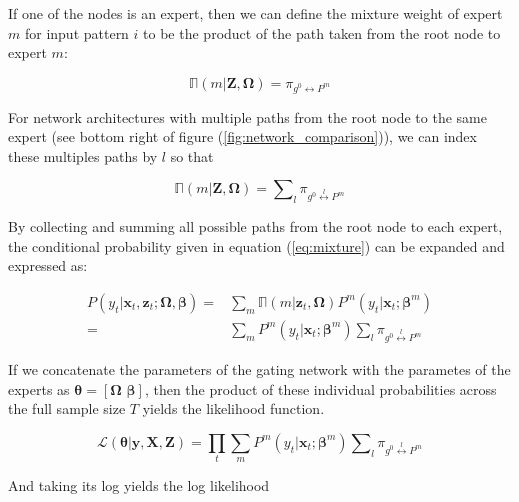 \documentclass[12pt]{article}
\newcommand{\gateprod}[2]{\pi_{#1 \longleftrightarrow #2}}
\newcommand{\sumgateprod}[3]{\pi_{#1 \overset{#3}{\longleftrightarrow} #2}}
\newcommand{\shortsum}[1]{\sum \nolimits_{#1}}
\newcommand{\expmixwt}[0]{\mathbb{\Pi}}
\begin{document}
If one of the nodes is an expert, then we can define the mixture weight
of expert $m$ for input pattern $i$ to be the product of the path taken
from the root node to expert $m$:

\begin{equation} \label{eq:gpath2}
  \expmixwt(m | \boldsymbol{Z}, \boldsymbol{\Omega}) = \gateprod{g^{0}}{P^{m}}
\end{equation}

For network architectures with multiple paths from the root node to
the same expert (see bottom right of figure (\ref{fig:network_comparison})),
we can index these multiples paths by $l$ so that

\begin{equation} \label{eq:pathsums}
  \expmixwt(m | \boldsymbol{Z}, \boldsymbol{\Omega}) = \shortsum{l} \sumgateprod{g^{0}}{P^{m}}{l} 
\end{equation}


By collecting and summing all possible paths from the root node to each
expert, the conditional probability given in equation (\ref{eq:mixture}) can be
expanded and expressed as:

\begin{equation} \label{eq:contribution}
  \begin{split}
    P(y_{t}| \boldsymbol{x}_{t}, \boldsymbol{z}_{t}; \boldsymbol{\Omega}, \boldsymbol{\beta}) =& \sum_{m} \expmixwt(m | \boldsymbol{z}_{t}, \boldsymbol{\Omega}) P^{m}(y_{t}| \boldsymbol{x}_{t}; \boldsymbol{\beta}^{m}) \\ 
      =& \sum_{m} P^{m}(y_{t}| \boldsymbol{x}_{t}; \boldsymbol{\beta}^{m}) \shortsum{l} \sumgateprod{g^{0}}{P^{m}}{l}
  \end{split}
\end{equation}

If we concatenate the parameters of the gating network with the parametes of
the experts as $\boldsymbol{\theta} = [\boldsymbol{\Omega} \,\, \boldsymbol{\beta}]$,
then the product of these individual probabilities across the full sample size $T$ yields
the likelihood function. 

\begin{equation} \label{eq:likelihood}
  \mathcal{L}(\boldsymbol{\theta}| \boldsymbol{y}, \boldsymbol{X}, \boldsymbol{Z}) = \prod_{t}\sum_{m}P^{m}(y_{t}| \boldsymbol{x}_{t}; \boldsymbol{\beta}^{m}) \shortsum{l} \sumgateprod{g^{0}}{P^{m}}{l}
\end{equation}

And taking its log yields the log likelihood
\end{document}
